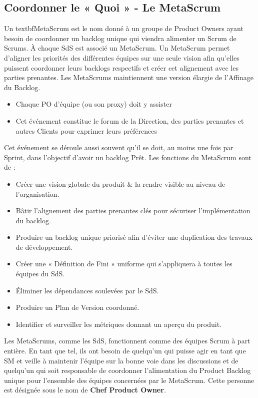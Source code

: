 \documentclass[12pt,a4paper,parskip=full]{scrartcl}
\begin{document}
\subsection{Coordonner le « Quoi » - Le MetaScrum}
Un textbf{MetaScrum} est le nom donné à un groupe de Product Owners ayant besoin de
coordonner un backlog unique qui viendra alimenter un Scrum de Scrums. À chaque SdS
est associé un MetaScrum. Un MetaScrum permet d’aligner les priorités des différentes
équipes sur une seule vision afin qu’elles puissent coordonner leurs backlogs respectifs et
créer cet alignement avec les parties prenantes. Les MetaScrums maintiennent une
version élargie de l’Affinage du Backlog.
\begin{itemize}
\item Chaque PO d’équipe (ou son proxy) doit y assister
\item Cet événement constitue le forum de la Direction, des parties prenantes et
autres Clients pour exprimer leurs préférences
\end{itemize}
Cet événement se déroule aussi souvent qu’il se doit, au moins une fois par Sprint, dans
l’objectif d’avoir un backlog Prêt. Les fonctions du MetaScrum sont de :
\begin{itemize}
\item Créer une vision globale du produit & la rendre visible au niveau de
l’organisation.
\item Bâtir l’alignement des parties prenantes clés pour sécuriser l’implémentation du
backlog.
\item Produire un backlog unique priorisé afin d’éviter une duplication des travaux de
développement.
\item Créer une « Définition de Fini » uniforme qui s’appliquera à toutes les équipes
du SdS.
\item Éliminer les dépendances soulevées par le SdS.
\item Produire un Plan de Version coordonné.
\item Identifier et surveiller les métriques donnant un aperçu du produit.
\end{itemize}
Les MetaScrums, comme les SdS, fonctionnent comme des équipes Scrum à part entière.
En tant que tel, ils ont besoin de quelqu’un qui puisse agir en tant que SM et veille à
maintenir l’équipe sur la bonne voie dans les discussions et de quelqu’un qui soit
responsable de coordonner l’alimentation du Product Backlog unique pour l’ensemble des
équipes concernées par le MetaScrum. Cette personne est désignée sous le nom de \textbf{Chef
Product Owner}.
\end{document}
